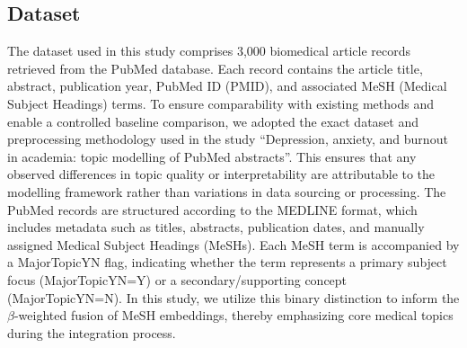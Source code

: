 \documentclass{ieeeaccess}
\begin{document}
\subsection{Dataset}
The dataset used in this study comprises 3,000 biomedical article records retrieved from the PubMed database. Each record contains the article title, abstract, publication year, PubMed ID (PMID), and associated MeSH (Medical Subject Headings) terms. To ensure comparability with existing methods and enable a controlled baseline comparison, we adopted the exact dataset and preprocessing methodology used in the study “Depression, anxiety, and burnout in academia: topic modelling of PubMed abstracts”\cite{ma_ai-powered_2025}. This ensures that any observed differences in topic quality or interpretability are attributable to the modelling framework rather than variations in data sourcing or processing.
The PubMed records are structured according to the MEDLINE format, which includes metadata such as titles, abstracts, publication dates, and manually assigned Medical Subject Headings (MeSHs). Each MeSH term is accompanied by a MajorTopicYN flag, indicating whether the term represents a primary subject focus (MajorTopicYN=Y) or a secondary/supporting concept (MajorTopicYN=N). In this study, we utilize this binary distinction to inform the $\beta$-weighted fusion of MeSH embeddings, thereby emphasizing core medical topics during the integration process.

\end{document}
